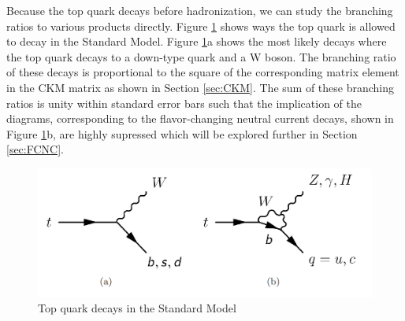 Because the top quark decays before hadronization, we can study the branching ratios to various products directly.  Figure \ref{fig:SMDecays} shows  ways the top quark is allowed to decay in the Standard Model.  Figure \ref{fig:SMDecays}a shows the most likely decays where the top quark decays to a down-type quark and a W boson.  The branching ratio of these decays is proportional to the square of the corresponding matrix element in the CKM matrix as shown in Section \ref{sec:CKM}.  The sum of these branching ratios is unity within standard error bars such that the implication of the diagrams, corresponding to the flavor-changing neutral current decays, shown in Figure \ref{fig:SMDecays}b, are highly supressed which will be explored further in Section \ref{sec:FCNC}.  


\begin{figure}[h!]
	\centering
	\includegraphics[width=\columnwidth]{../ThesisImages/Theory/SMTopDecays.png}
	\caption[Top quark decays in the Standard Model]{Top quark decays in the Standard Model}
	\label{fig:SMDecays}
\end{figure}

